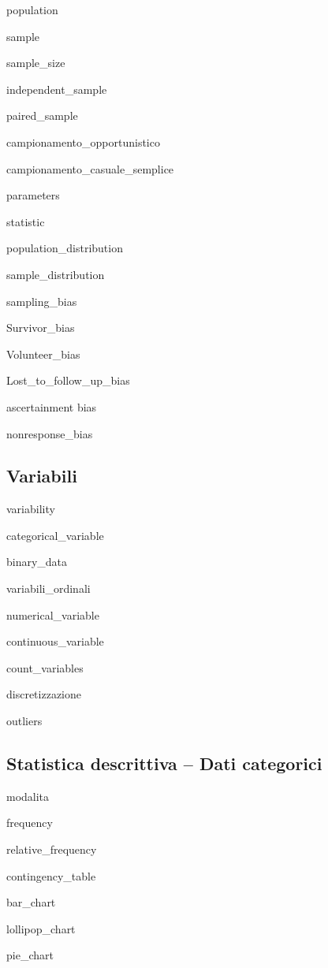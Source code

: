 \documentclass{report}
\begin{document}
\gls{population}

\gls{sample}

\gls{sample_size}

\gls{independent_sample}

\gls{paired_sample}

\gls{campionamento_opportunistico}

\gls{campionamento_casuale_semplice}

\gls{parameters}

\gls{statistic}

\gls{population_distribution}

\gls{sample_distribution}

\gls{sampling_bias}

\gls{Survivor_bias}

\gls{Volunteer_bias}

\gls{Lost_to_follow_up_bias}

\gls{ascertainment bias}

\gls{nonresponse_bias}




\subsection*{Variabili}

\gls{variability}

\gls{categorical_variable}

\gls{binary_data}

\gls{variabili_ordinali}

\gls{numerical_variable}

\gls{continuous_variable}

\gls{count_variables}

\gls{discretizzazione}

\gls{outliers}



\subsection*{Statistica descrittiva -- Dati categorici}

\gls{modalita}

\gls{frequency}

\gls{relative_frequency}

\gls{contingency_table}

\gls{bar_chart}

\gls{lollipop_chart}

\gls{pie_chart}
\end{document}
